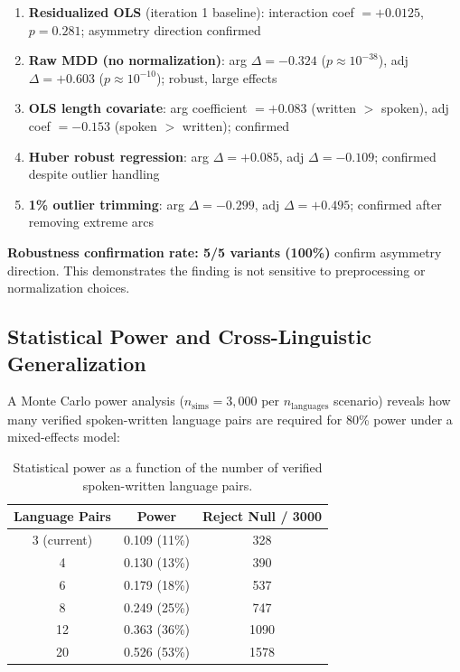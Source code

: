 \documentclass[11pt,letterpaper]{article}
\begin{document}
\begin{enumerate}
  \item \textbf{Residualized OLS} (iteration 1 baseline): interaction coef $= +0.0125$, $p = 0.281$; asymmetry direction confirmed
  \item \textbf{Raw MDD (no normalization)}: arg $\Delta = -0.324$ ($p \approx 10^{-38}$), adj $\Delta = +0.603$ ($p \approx 10^{-10}$); robust, large effects
  \item \textbf{OLS length covariate}: arg coefficient $= +0.083$ (written $>$ spoken), adj coef $= -0.153$ (spoken $>$ written); confirmed
  \item \textbf{Huber robust regression}: arg $\Delta = +0.085$, adj $\Delta = -0.109$; confirmed despite outlier handling
  \item \textbf{1\% outlier trimming}: arg $\Delta = -0.299$, adj $\Delta = +0.495$; confirmed after removing extreme arcs
\end{enumerate}

\textbf{Robustness confirmation rate: 5/5 variants (100\%)} confirm asymmetry direction. This demonstrates the finding is not sensitive to preprocessing or normalization choices.

\subsection{Statistical Power and Cross-Linguistic Generalization}

A Monte Carlo power analysis ($n_\text{sims} = 3{,}000$ per $n_\text{languages}$ scenario) reveals how many verified spoken-written language pairs are required for 80\% power under a mixed-effects model:

\begin{table}[!htbp]
\centering
\caption{Statistical power as a function of the number of verified spoken-written language pairs.}
\label{tab:power}
\begin{tabular}{ccc}
\toprule
\textbf{Language Pairs} & \textbf{Power} & \textbf{Reject Null / 3000} \\
\midrule
3 (current) & 0.109 (11\%) & 328 \\
4           & 0.130 (13\%) & 390 \\
6           & 0.179 (18\%) & 537 \\
8           & 0.249 (25\%) & 747 \\
12          & 0.363 (36\%) & 1090 \\
20          & 0.526 (53\%) & 1578 \\
\bottomrule
\end{tabular}
\end{table}
\end{document}
